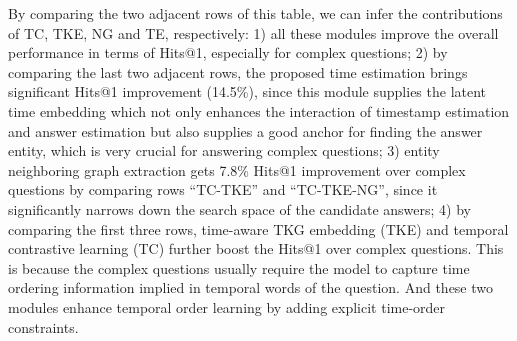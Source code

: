 \documentclass[11pt]{article}
\newcommand{\gt}[1]{{{\textcolor{cyan}{[gt: #1]}}}}
\begin{document}
By comparing the two adjacent rows of this table, we can infer the contributions of TC, TKE, NG and TE, respectively: 1) all these modules improve the overall performance in terms of Hits@1, especially for complex questions; 2) by comparing the last two adjacent rows, the proposed time estimation brings significant Hits@1 improvement (14.5\%), since this module supplies the latent time embedding which not only enhances the interaction of timestamp estimation and answer estimation but also supplies a good anchor for finding the answer entity, which is very crucial for answering complex questions; 3) entity neighboring graph extraction gets 7.8\% Hits@1 improvement over complex questions by comparing rows ``{TC}-{TKE}'' and ``{TC}-{TKE}-{NG}'', since it significantly narrows down the search space of the candidate answers; 
4) by comparing the first three rows, time-aware TKG embedding (TKE) and temporal contrastive learning (TC) further boost the Hits@1 over complex questions. This is because the complex questions usually require the model  to capture time ordering information implied in temporal words of the question. 
And these two modules enhance temporal order learning by adding explicit time-order constraints.
\end{document}
